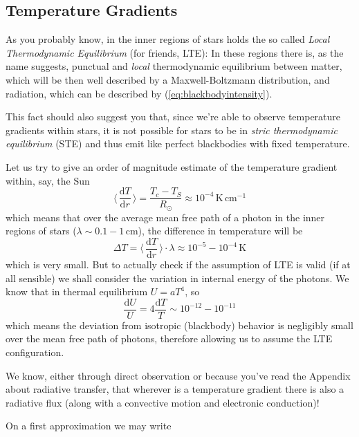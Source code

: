 \subsection{Temperature Gradients}

\par As you probably know, in the inner regions of stars holds the so called \emph{Local Thermodynamic Equilibrium} (for friends, LTE): In these regions there is, as the name suggests, punctual and \emph{local} thermodynamic equilibrium between matter, which will be then well described by a Maxwell-Boltzmann distribution, and radiation, which can be described by (\ref{eq:blackbodyintensity}).
\par This fact should also suggest you that, since we're able to observe temperature gradients within stars, it is not possible for stars to be in \emph{stric thermodynamic equilibrium} (STE) and thus emit like perfect blackbodies with fixed temperature.
\par Let us try to give an order of magnitude estimate of the temperature gradient within, say, the Sun
\begin{equation*}
	\langle\,\frac{\text{d}T}{\text{d}r}\,\rangle = \frac{T_{c}-T_{S}}{R_{\odot}} \approx 10^{-4}\,\text{K}\,\text{cm}^{-1}
\end{equation*}
which means that over the average mean free path of a photon in the inner regions of stars ($\lambda\sim 0.1-1\,\text{cm}$), the difference in temperature will be
\begin{equation*}
	\Delta T = \langle\,\frac{\text{d}T}{\text{d}r}\,\rangle\cdot \lambda \approx 10^{-5}-10^{-4}\,\text{K}
\end{equation*}
which is very small. But to actually check if the assumption of LTE is valid (if at all sensible) we shall consider the variation in internal energy of the photons. We know that in thermal equilibrium $U = aT^{4}$, so 
\begin{equation*}
	\frac{\text{d}U}{U} = 4\frac{\text{d}T}{T} \sim 10^{-12}-10^{-11}
\end{equation*}
which means the deviation from isotropic (blackbody) behavior is negligibly small over the mean free path of photons, therefore allowing us to assume the LTE configuration. 
\par We know, either through direct observation or because you've read the Appendix about radiative transfer, that wherever is a temperature gradient there is also a radiative flux (along with a convective motion and electronic conduction)!
\par On a first approximation we may write
